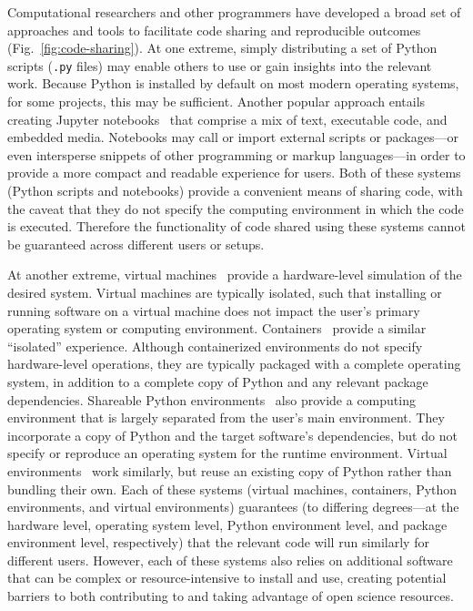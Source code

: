 \documentclass[preprint,12pt,a4paper]{elsarticle}
\begin{document}
Computational researchers and other programmers have de\-vel\-oped a
broad set of approaches and tools to facilitate code sharing and
reproducible outcomes (Fig.~\ref{fig:code-sharing}). At one extreme,
simply distributing a set of Python scripts (\texttt{.py} files) may
enable others to use or gain insights into the relevant work. Because
Python is installed by default on most modern operating systems, for
some projects, this may be sufficient. Another popular approach
entails creating Jupyter notebooks~\cite{KluyEtal16} that comprise a
mix of text, executable code, and embedded media. Notebooks may call
or import external scripts or packages---or even intersperse snippets
of other programming or markup lang\-uages---in order to provide a
more compact and readable experience for users. Both of these systems
(Python scripts and notebooks) provide a convenient means of sharing
code, with the caveat that they do not specify the computing
environment in which the code is executed. Therefore the functionality
of code shared using these systems cannot be guaranteed across
different users or setups.

At another extreme, virtual machines~\cite{Gold74, AltiEtal05, Rose99}
provide a hardware-level simulation of the desired system. Virtual
machines are typically isolated, such that installing or running
software on a virtual machine does not impact the user's primary
operating system or computing environment.
Containers~\cite[e.g.,][]{Merk14, KurtEtal17} provide a similar
``isolated'' experience. Although containerized environments do not
specify hardware-level operations, they are typically packaged with a
complete operating system, in addition to a complete copy of Python
and any relevant package dependencies. Shareable Python
environments~\cite[e.g.,][]{Anac12} also provide a computing
environment that is largely separated from the user's main
environment. They incorporate a copy of Python and the target
software's dependencies, but do not specify or
reproduce an operating system for the runtime environment.
Virtual environments~\cite[e.g.,][]{BickEtal07, Eust19} work similarly, but
reuse an existing copy of Python rather than bundling their own.
Each of these systems (virtual machines, containers, Python environments, and virtual environments)
guarantees (to differing degrees---at the hardware level, operating
system level, Python environment level, and package environment level, respectively) that the
relevant code will run similarly for different users. However, each of
these systems also relies on additional software that can be complex
or resource-intensive to install and use, creating potential barriers
to both contributing to and taking advantage of open science
resources.
\end{document}
